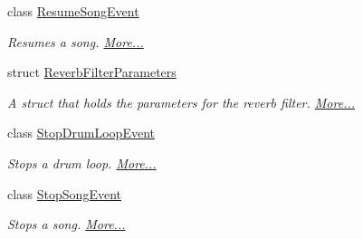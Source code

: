 \begin{DoxyCompactItemize}
class \hyperlink{group___v_i_m_event_types_class_virtual_instrument_manager_1_1_resume_song_event}{Resume\+Song\+Event}
\begin{DoxyCompactList}\small\item\em Resumes a song.  \hyperlink{group___v_i_m_event_types_class_virtual_instrument_manager_1_1_resume_song_event}{More...}\end{DoxyCompactList}\item 
struct \hyperlink{group__filter_params_struct_virtual_instrument_manager_1_1_reverb_filter_parameters}{Reverb\+Filter\+Parameters}
\begin{DoxyCompactList}\small\item\em A struct that holds the parameters for the reverb filter.  \hyperlink{group__filter_params_struct_virtual_instrument_manager_1_1_reverb_filter_parameters}{More...}\end{DoxyCompactList}\item 
class \hyperlink{group___v_i_m_event_types_class_virtual_instrument_manager_1_1_stop_drum_loop_event}{Stop\+Drum\+Loop\+Event}
\begin{DoxyCompactList}\small\item\em Stops a drum loop.  \hyperlink{group___v_i_m_event_types_class_virtual_instrument_manager_1_1_stop_drum_loop_event}{More...}\end{DoxyCompactList}\item 
class \hyperlink{group___v_i_m_event_types_class_virtual_instrument_manager_1_1_stop_song_event}{Stop\+Song\+Event}
\begin{DoxyCompactList}\small\item\em Stops a song.  \hyperlink{group___v_i_m_event_types_class_virtual_instrument_manager_1_1_stop_song_event}{More...}\end{DoxyCompactList}\end{DoxyCompactItemize}
